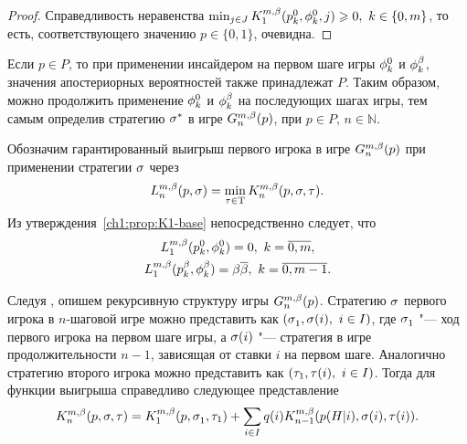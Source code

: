 {\begin{proof}
  Справедливость неравенства $\min_{j \in J} \K*{1}(\pEven, \fEven, j) \geq 0,\ k \in \{0, m\}$, то есть, соответствующего значению $p \in \{0, 1\}$, очевидна.
\end{proof}

\begin{remark}
  \label{ch1:remark:posterior-probs}
  Если $p \in P$, то при применении инсайдером на первом шаге игры $\phi^0_{k}$ и $\phi^{\beta}_{k}$, значения апостериорных вероятностей также принадлежат $P$.
  Таким образом, можно продолжить применение $\phi^0_{k}$ и $\phi^{\beta}_{k}$ на последующих шагах игры, тем самым определив стратегию $\sigma^*$ в игре $\theG*{n}(p)$, при $p \in P, \, n \in \mathbb{N}$.
\end{remark}

Обозначим гарантированный выигрыш первого игрока в игре $\theG*{n}(p)$ при применении стратегии $\sigma$ через
\begin{equation*}
  \L*{n}(p, \sigmar) = \min_{\taur \in \Tau} \K*{n}(p, \sigmar, \taur).
\end{equation*}
Из утверждения~\ref{ch1:prop:K1-base} непосредственно следует, что
\begin{equation}
  \label{ch1:eq:L_1(p)}
  \begin{gathered}
  \L*{1}(\pEven, \fEven) = 0,\ k = \overline{0,m},\\
  \L*{1}(\pOdd, \fOdd) = \Co \DCo,\ k = \overline{0,m-1}.
  \end{gathered}
\end{equation}

Следуя \cite{domansky07}, опишем рекурсивную структуру игры $\theG*{n}(p)$.
Стратегию $\sigma$ первого игрока в $n$-шаговой игре можно представить как
$(\sigmas{1}, \sigmara{i},\ i \in I)$, где $\sigmas{1}$ "--- ход первого игрока на первом шаге игры, а $\sigma(i)$ "--- стратегия в игре продолжительности $n-1$, зависящая от ставки $i$ на первом шаге.
Аналогично стратегию второго игрока можно представить как $(\tau_{1}, \tau(i),\ i \in I)$.
Тогда для функции выигрыша справедливо следующее представление
\begin{equation}
  \label{ch1:eq:recursive-structure}
  \K*{n}(p, \sigmar, \taur) = 
  \K*{1}(p, \sigmas{1}, \taus{1}) + 
  \sum_{i \in I} \qc{i} \K*{n-1}(\pac{H}{i}, \sigmara{i}, \taura{i}).
\end{equation}

}
